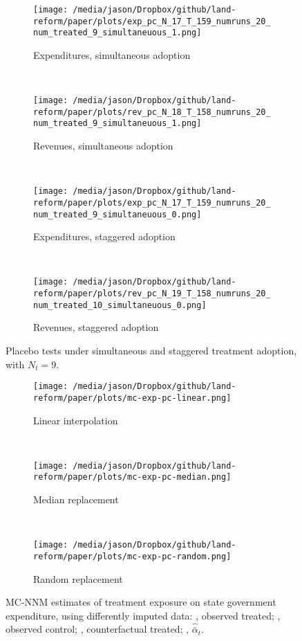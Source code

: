 \begin{figure}[htbp]
	\centering
	\begin{subfigure}[t]{0.48\textwidth}
		\centering
		\texttt{[image: /media/jason/Dropbox/github/land-reform/paper/plots/exp\_pc\_N\_17\_T\_159\_numruns\_20\_num\_treated\_9\_simultaneuous\_1.png]}
		\caption{Expenditures, simultaneous adoption}
	\end{subfigure}
	~ 
	\begin{subfigure}[t]{0.48\textwidth}
		\centering
		\texttt{[image: /media/jason/Dropbox/github/land-reform/paper/plots/rev\_pc\_N\_18\_T\_158\_numruns\_20\_num\_treated\_9\_simultaneuous\_1.png]}
		\caption{Revenues, simultaneous adoption}
	\end{subfigure}
	~ 
	\begin{subfigure}[t]{0.48\textwidth}
		\centering
		\texttt{[image: /media/jason/Dropbox/github/land-reform/paper/plots/exp\_pc\_N\_17\_T\_159\_numruns\_20\_num\_treated\_9\_simultaneuous\_0.png]}
		\caption{Expenditures, staggered adoption}
	\end{subfigure}
	~ 
	\begin{subfigure}[t]{0.48\textwidth}
		\centering
		\texttt{[image: /media/jason/Dropbox/github/land-reform/paper/plots/rev\_pc\_N\_19\_T\_158\_numruns\_20\_num\_treated\_10\_simultaneuous\_0.png]}
		\caption{Revenues, staggered adoption}
	\end{subfigure}
	\caption{Placebo tests under simultaneous and staggered treatment adoption, with $N_t = 9$. \label{mc-sim}} 
\end{figure}

\begin{figure*}[htbp]
	\centering
	\begin{subfigure}[t]{0.43\textwidth}
		\centering
		\texttt{[image: /media/jason/Dropbox/github/land-reform/paper/plots/mc-exp-pc-linear.png]}
		\caption{Linear interpolation} 
	\end{subfigure}
	~ 
	\begin{subfigure}[t]{0.43\textwidth}
		\centering
		\texttt{[image: /media/jason/Dropbox/github/land-reform/paper/plots/mc-exp-pc-median.png]}
		\caption{Median replacement}
	\end{subfigure}
	~ 
	\begin{subfigure}[t]{0.43\textwidth}
		\centering
		\texttt{[image: /media/jason/Dropbox/github/land-reform/paper/plots/mc-exp-pc-random.png]}
		\caption{Random replacement}
	\end{subfigure}
	\caption{MC-NNM estimates of treatment exposure on state government expenditure, using differently imputed data:				
		{\color{Darjeeling15}{\sampleline{}}}, observed treated;
		{}, observed control;
		{}, counterfactual treated;
		{}, $\hat{\bar{\alpha}}_{t}$.\label{mc-estimates-exp-pc-imp}} 
\end{figure*}


